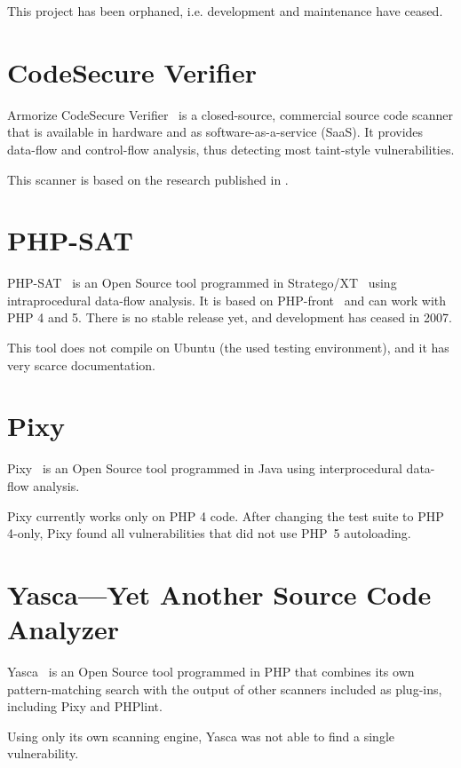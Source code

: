 This project has been orphaned, i.e. development and maintenance have ceased.

\section{CodeSecure Verifier}
\label{armorize}
Armorize CodeSecure Verifier~\cite{codesecure, verifier} is a closed-source, commercial source code scanner that is available in hardware and as software-as-a-service (SaaS). It provides data-flow and control-flow analysis, thus detecting most taint-style vulnerabilities.

This scanner is based on the research published in \cite{huang-securing}.

\section{PHP-SAT}
\label{php-sat}
PHP-SAT~\cite{php-sat} is an Open Source tool programmed in Stratego/XT~\cite{stratego} using intraprocedural data-flow analysis. It is based on PHP-front~\cite{php-front} and can work with PHP 4 and 5. There is no stable release yet, and development has ceased in 2007.

This tool does not compile on Ubuntu (the used testing environment), and it has very scarce documentation.

\section{Pixy}
\label{pixy-comparison}
Pixy~\cite{pixy} is an Open Source tool programmed in Java using interprocedural data-flow analysis.

Pixy currently works only on PHP 4 code. After changing the test suite to PHP 4-only, Pixy found all vulnerabilities that did not use PHP~5 autoloading.

\section{Yasca---Yet Another Source Code Analyzer}
\label{yasca}
Yasca~\cite{yasca} is an Open Source tool programmed in PHP that combines its own pattern-matching search with the output of other scanners included as plug-ins, including Pixy and PHPlint.

Using only its own scanning engine, Yasca was not able to find a single vulnerability.


